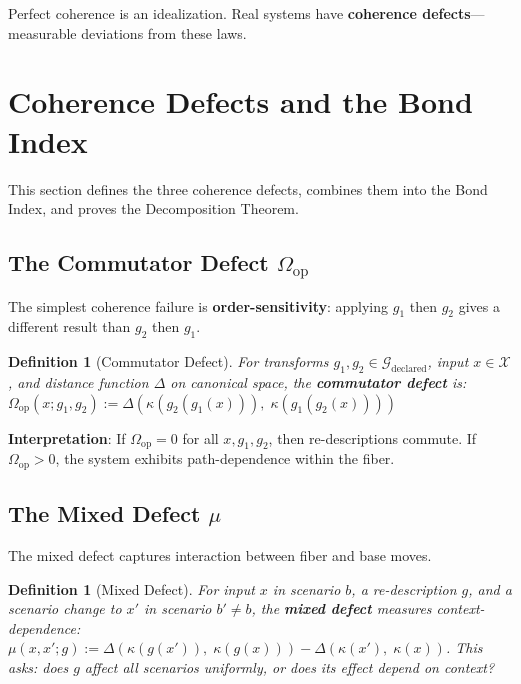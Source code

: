 \documentclass[12pt]{article}
\newtheorem{definition}[theorem]{Definition}
\begin{document}
Perfect coherence is an idealization. Real systems have \textbf{coherence defects}---measurable deviations from these laws.

\section{Coherence Defects and the Bond Index}

This section defines the three coherence defects, combines them into the Bond Index, and proves the Decomposition Theorem.

\subsection{The Commutator Defect $\Omega_{\mathrm{op}}$}

The simplest coherence failure is \textbf{order-sensitivity}: applying $g_1$ then $g_2$ gives a different result than $g_2$ then $g_1$.

\begin{definition}[Commutator Defect]
\emph{For transforms $g_1, g_2 \in \mathcal{G}_{\mathrm{declared}}$, input $x \in \mathcal{X}$, and distance function $\Delta$ on canonical space, the \textbf{commutator defect} is:} $\Omega_{\mathrm{op}}(x; g_1, g_2) := \Delta(\kappa(g_2(g_1(x))),\; \kappa(g_1(g_2(x))))$
\end{definition}

\textbf{Interpretation}: If $\Omega_{\mathrm{op}} = 0$ for all $x, g_1, g_2$, then re-descriptions commute. If $\Omega_{\mathrm{op}} > 0$, the system exhibits path-dependence within the fiber.

\subsection{The Mixed Defect $\mu$}

The mixed defect captures interaction between fiber and base moves.

\begin{definition}[Mixed Defect]
\emph{For input $x$ in scenario $b$, a re-description $g$, and a scenario change to $x'$ in scenario $b' \neq b$, the \textbf{mixed defect} measures context-dependence:} $\mu(x, x'; g) := \Delta(\kappa(g(x')),\; \kappa(g(x))) - \Delta(\kappa(x'),\; \kappa(x))$. \emph{This asks: does $g$ affect all scenarios uniformly, or does its effect depend on context?}
\end{definition}
\end{document}
